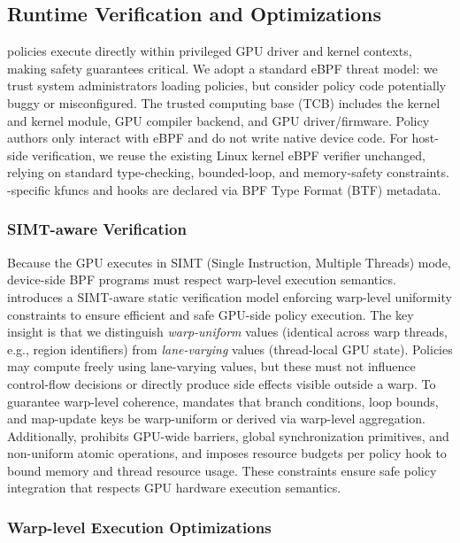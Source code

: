 \subsection{Runtime Verification and Optimizations}
\label{sec:verification}

\sys policies execute directly within privileged GPU driver and kernel contexts, making safety guarantees critical. We adopt a standard eBPF threat model: we trust system administrators loading policies, but consider policy code potentially buggy or misconfigured. The trusted computing base (TCB) includes the kernel and \sys kernel module, GPU compiler backend, and GPU driver/firmware. Policy authors only interact with eBPF and do not write native device code. For host-side verification, we reuse the existing Linux kernel eBPF verifier unchanged, relying on standard type-checking, bounded-loop, and memory-safety constraints. \sys-specific kfuncs and hooks are declared via BPF Type Format (BTF) metadata.

\subsubsection{SIMT-aware Verification}

Because the GPU executes in SIMT (Single Instruction, Multiple Threads) mode, device-side BPF programs must respect warp-level execution semantics. \sys introduces a SIMT-aware static verification model enforcing warp-level uniformity constraints to ensure efficient and safe GPU-side policy execution.
The key insight is that we distinguish \emph{warp-uniform} values (identical across warp threads, e.g., region identifiers) from \emph{lane-varying} values (thread-local GPU state). Policies may compute freely using lane-varying values, but these must not influence control-flow decisions or directly produce side effects visible outside a warp. To guarantee warp-level coherence, \sys mandates that branch conditions, loop bounds, and map-update keys be warp-uniform or derived via warp-level aggregation. Additionally, \sys prohibits GPU-wide barriers, global synchronization primitives, and non-uniform atomic operations, and imposes resource budgets per policy hook to bound memory and thread resource usage. These constraints ensure safe policy integration that respects GPU hardware execution semantics.

\subsubsection{Warp-level Execution Optimizations}


